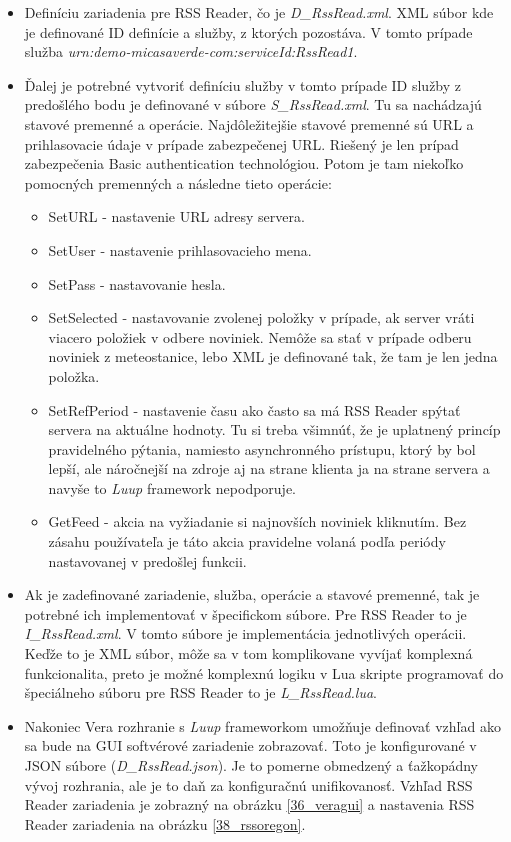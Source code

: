 \begin{itemize}
  \item Definíciu zariadenia pre RSS Reader, čo je \textit{D\_RssRead.xml}. XML súbor kde je definované ID definície a služby, z ktorých pozostáva. V tomto prípade služba \textit{urn:demo-micasaverde-com:serviceId:RssRead1}.
  \item Ďalej je potrebné vytvoriť definíciu služby v tomto prípade ID služby z predošlého bodu je definované v súbore \textit{S\_RssRead.xml}. Tu sa nachádzajú stavové premenné a operácie. Najdôležitejšie stavové premenné sú URL a prihlasovacie údaje v prípade zabezpečenej URL. Riešený je len prípad zabezpečenia Basic authentication technológiou. Potom je tam niekoľko pomocných premenných a následne tieto operácie:
  \begin{itemize}
    \item SetURL - nastavenie URL adresy servera.
    \item SetUser - nastavenie prihlasovacieho mena.
    \item SetPass - nastavovanie hesla.
    \item SetSelected - nastavovanie zvolenej položky v prípade, ak server vráti viacero položiek v odbere noviniek. Nemôže sa stať v prípade odberu noviniek z meteostanice, lebo XML je definované tak, že tam je len jedna položka.
    \item SetRefPeriod - nastavenie času ako často sa má RSS Reader spýtať servera na aktuálne hodnoty. Tu si treba všimnúť, že je uplatnený princíp pravidelného pýtania, namiesto asynchronného prístupu, ktorý by bol lepší, ale náročnejší na zdroje aj na strane klienta ja na strane servera a navyše to \textit{Luup} framework nepodporuje.
    \item GetFeed - akcia na vyžiadanie si najnovších noviniek kliknutím. Bez zásahu používateľa je táto akcia pravidelne volaná podľa periódy nastavovanej v predošlej funkcii.
  \end{itemize}  
  \item Ak je zadefinované zariadenie, služba, operácie a stavové premenné, tak je potrebné ich implementovať v špecifickom súbore. Pre RSS Reader to je \textit{I\_RssRead.xml}. V tomto súbore je implementácia jednotlivých operácii. Keďže to je XML súbor, môže sa v tom komplikovane vyvíjať komplexná funkcionalita, preto je možné komplexnú logiku v Lua skripte programovať do špeciálneho súboru pre RSS Reader to je \textit{L\_RssRead.lua}. 
  \item Nakoniec Vera rozhranie s \textit{Luup} frameworkom umožňuje definovať vzhľad ako sa bude na GUI softvérové zariadenie zobrazovať. Toto je konfigurované v JSON súbore (\textit{D\_RssRead.json}). Je to pomerne obmedzený a ťažkopádny vývoj rozhrania, ale je to daň za konfiguračnú unifikovanosť. Vzhľad RSS Reader zariadenia je zobrazný na obrázku  \ref{36_veragui} a nastavenia RSS Reader zariadenia na obrázku \ref{38_rssoregon}.  
\end{itemize}
